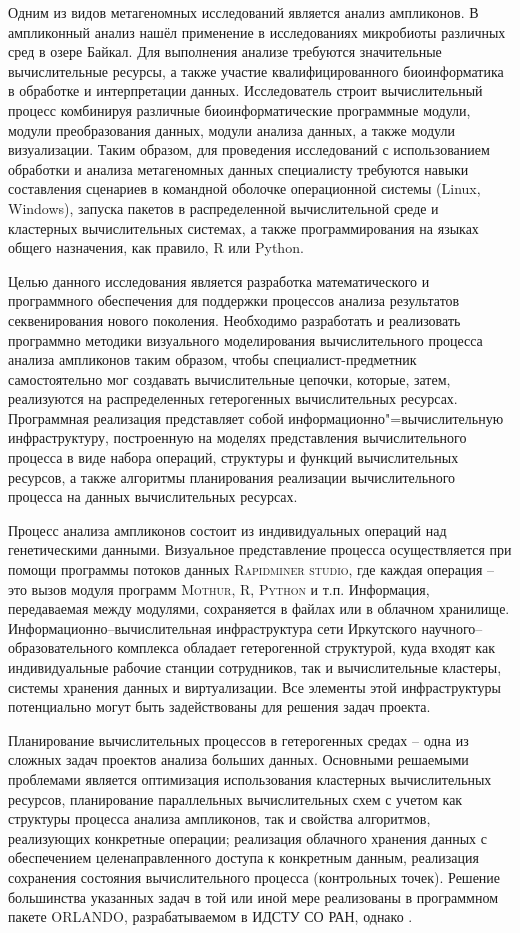 \documentclass[12pt]{llncs}  %
\begin{document}
Одним из видов метагеномных исследований является анализ ампликонов. В ампликонный анализ нашёл применение в исследованиях микробиоты различных сред в озере Байкал.  Для выполнения анализе требуются значительные вычислительные ресурсы, а также участие квалифицированного биоинформатика в обработке и интерпретации данных.  Исследователь строит вычислительный процесс комбинируя различные биоинформатические программные модули, модули преобразования данных, модули анализа данных, а также модули визуализации.  Таким образом, для проведения исследований с использованием обработки и анализа метагеномных данных специалисту требуются навыки составления сценариев в командной оболочке операционной системы (Linux, Windows), запуска пакетов в распределенной вычислительной среде и кластерных вычислительных системах, а также программирования на языках общего назначения, как правило, R или Python.

Целью данного исследования является разработка математического и программного обеспечения для поддержки процессов анализа результатов секвенирования нового поколения.  Необходимо разработать и реализовать программно методики визуального моделирования вычислительного процесса анализа ампликонов таким образом, чтобы специалист-предметник самостоятельно мог создавать вычислительные цепочки, которые, затем, реализуются на распределенных гетерогенных вычислительных ресурсах.  Программная реализация представляет собой информационно"=вычислительную инфраструктуру, построенную на моделях представления вычислительного процесса в виде набора операций, структуры и функций вычислительных ресурсов, а также алгоритмы планирования реализации вычислительного процесса на данных вычислительных ресурсах.

Процесс анализа ампликонов состоит из индивидуальных операций над генетическими данными.  Визуальное представление процесса осуществляется при помощи программы потоков данных \cite{} \textsc{Rapidminer studio}, где каждая операция -- это вызов модуля программ \textsc{Mothur}, \textsc{R}, \textsc{Python} и т.п.  Информация, передаваемая между модулями, сохраняется в файлах или в облачном хранилище.  Информационно--вычислительная инфраструктура сети Иркутского научного--образовательного комплекса обладает гетерогенной структурой, куда входят как индивидуальные рабочие станции сотрудников, так и вычислительные кластеры, системы хранения данных и виртуализации.  Все элементы этой инфраструктуры потенциально могут быть задействованы для решения задач проекта.

Планирование вычислительных процессов в гетерогенных средах -- одна из сложных задач проектов анализа больших данных.  Основными решаемыми проблемами является оптимизация использования кластерных вычислительных ресурсов, планирование параллельных вычислительных схем с учетом как структуры процесса анализа ампликонов, так и свойства алгоритмов, реализующих конкретные операции; реализация облачного хранения данных с обеспечением целенаправленного доступа к конкретным данным, реализация сохранения состояния вычислительного процесса (контрольных точек).  Решение большинства указанных задач в той или иной мере реализованы в программном пакете ORLANDO, разрабатываемом в ИДСТУ СО РАН, однако .
\end{document}
